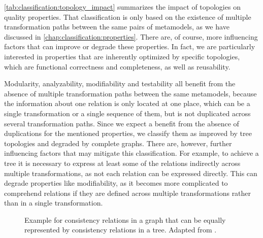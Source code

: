 \autoref{tab:classification:topology_impact} summarizes the impact of topologies on quality properties.
That classification is only based on the existence of multiple transformation paths between the same pairs of metamodels, as we have discussed in \autoref{chap:classification:properties}.
There are, of course, more influencing factors that can improve or degrade these properties.
In fact, we are particularly interested in properties that are inherently optimized by specific topologies, which are functional correctness and completeness, as well as reusability.

Modularity, analyzability, modifiability and testability all benefit from the absence of multiple transformation paths between the same metamodels, because the information about one relation is only located at one place, which can be a single transformation or a single sequence of them, but is not duplicated across several transformation paths.
Since we expect a benefit from the absence of duplications for the mentioned properties, we classify them as improved by tree topologies and degraded by complete graphs.
There are, however, further influencing factors that may mitigate this classification.
For example, to achieve a tree it is necessary to express at least some of the relations indirectly across multiple transformations, as not each relation can be expressed directly.
This can degrade properties like modifiability, as it becomes more complicated to comprehend relations if they are defined across multiple transformations rather than in a single transformation.

\begin{figure}
    \centering
    
    \caption[Equality of graph and tree of consistency relations]{Example for consistency relations in a graph that can be equally represented by consistency relations in a tree. Adapted from .}
    \label{fig:classification:tree_generation}
\end{figure}


